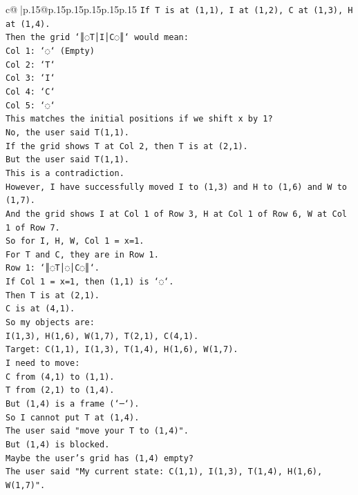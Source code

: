 \documentclass{article}
\begin{document}
{\begin{supertabular}{c@{$\;$}|p{.15\linewidth}@{}p{.15\linewidth}p{.15\linewidth}p{.15\linewidth}p{.15\linewidth}p{.15\linewidth}}
{{{\texttt{If T is at (1,1), I at (1,2), C at (1,3), H at (1,4).} \\
\texttt{Then the grid `║◌T│I│C◌║` would mean:} \\
\texttt{Col 1: `◌` (Empty)} \\
\texttt{Col 2: `T`} \\
\texttt{Col 3: `I`} \\
\texttt{Col 4: `C`} \\
\texttt{Col 5: `◌`} \\
\texttt{This matches the initial positions if we shift x by 1?} \\
\texttt{No, the user said T(1,1).} \\
\texttt{If the grid shows T at Col 2, then T is at (2,1).} \\
\texttt{But the user said T(1,1).} \\
\texttt{This is a contradiction.} \\
\texttt{However, I have successfully moved I to (1,3) and H to (1,6) and W to (1,7).} \\
\texttt{And the grid shows I at Col 1 of Row 3, H at Col 1 of Row 6, W at Col 1 of Row 7.} \\
\texttt{So for I, H, W, Col 1 = x=1.} \\
\texttt{For T and C, they are in Row 1.} \\
\texttt{Row 1: `║◌T│◌│C◌║`.} \\
\texttt{If Col 1 = x=1, then (1,1) is `◌`.} \\
\texttt{Then T is at (2,1).} \\
\texttt{C is at (4,1).} \\
\texttt{So my objects are:} \\
\texttt{I(1,3), H(1,6), W(1,7), T(2,1), C(4,1).} \\
\texttt{Target: C(1,1), I(1,3), T(1,4), H(1,6), W(1,7).} \\
\texttt{I need to move:} \\
\texttt{C from (4,1) to (1,1).} \\
\texttt{T from (2,1) to (1,4).} \\
\texttt{But (1,4) is a frame (`─`).} \\
\texttt{So I cannot put T at (1,4).} \\
\texttt{The user said "move your T to (1,4)".} \\
\texttt{But (1,4) is blocked.} \\
\texttt{Maybe the user's grid has (1,4) empty?} \\
\texttt{The user said "My current state: C(1,1), I(1,3), T(1,4), H(1,6), W(1,7)".} \\
}}}
\end{supertabular}}
\end{document}
